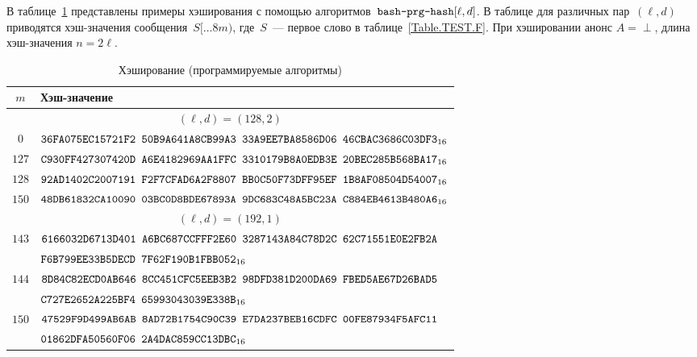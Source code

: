 \label{TEST.PrgHash}

В таблице~\ref{Table.TEST.PrgHash} представлены примеры хэширования
с помощью алгоритмов~$\texttt{bash-prg-hash}[\ell,d]$.
%
В таблице для различных пар~$(\ell,d)$ приводятся хэш-значения 
сообщения~$S[\dots 8m)$, где~$S$~--- первое слово в таблице~\ref{Table.TEST.F}.
%
При хэшировании анонс $A=\perp$, длина хэш-значения $n=2\ell$.

\begin{table}[H]
\caption{Хэширование (программируемые алгоритмы)}\label{Table.TEST.PrgHash}
\begin{tabular}{|c|l|}
\hline
$m$ & Хэш-значение\\
\hline
%
\hline
\multicolumn{2}{|c|}{$(\ell,d)=(128,2)$}\\
\hline
$0$ &
$\texttt{36FA075EC15721F2~50B9A641A8CB99A3~33A9EE7BA8586D06~46CBAC3686C03DF3}_{16}$\\
\hline
$127$ &
$\texttt{C930FF427307420D~A6E4182969AA1FFC~3310179B8A0EDB3E~20BEC285B568BA17}_{16}$\\
\hline                                                        
$128$ &
$\texttt{92AD1402C2007191~F2F7CFAD6A2F8807~BB0C50F73DFF95EF~1B8AF08504D54007}_{16}$\\
\hline                                                        
$150$ &
$\texttt{48DB61832CA10090~03BC0D8BDE67893A~9DC683C48A5BC23A~C884EB4613B480A6}_{16}$\\
%
\hline
\hline
\multicolumn{2}{|c|}{$(\ell,d)=(192,1)$}\\
\hline
$143$ &
$\texttt{6166032D6713D401~A6BC687CCFFF2E60~3287143A84C78D2C~62C71551E0E2FB2A}$\\
&
 $\texttt{F6B799EE33B5DECD~7F62F190B1FBB052}_{16}$\\
\hline
$144$ &
$\texttt{8D84C82ECD0AB646~8CC451CFC5EEB3B2~98DFD381D200DA69~FBED5AE67D26BAD5}$\\
&
 $\texttt{C727E2652A225BF4~65993043039E338B}_{16}$\\
\hline                                                        
$150$ &
$\texttt{47529F9D499AB6AB~8AD72B1754C90C39~E7DA237BEB16CDFC~00FE87934F5AFC11}$\\
&
 $\texttt{01862DFA50560F06~2A4DAC859CC13DBC}_{16}$\\
\hline
\end{tabular}
\end{table}

